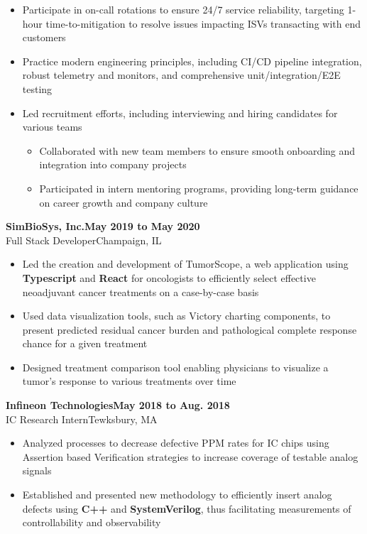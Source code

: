 \documentclass[9pt]{extarticle}
\newcommand{\experiencesubsection}[4]{
    \vspace{0.75em}\Large\textbf{#1\hfill{#4}}\\{#2}\hfill{#3}\normalsize
}
\begin{document}
\begin{minipage}[t]{.7\textwidth}
\begin{itemize}
\begin{itemize}[topsep=0pt]
            \end{itemize}
        \item Participate in on-call rotations to ensure 24/7 service reliability, targeting 1-hour time-to-mitigation to resolve issues impacting ISVs transacting with end customers
        \item Practice modern engineering principles, including CI/CD pipeline integration, robust telemetry and monitors, and comprehensive unit/integration/E2E testing 
        \item Led recruitment efforts, including interviewing and hiring candidates for various teams
            \begin{itemize}[topsep=0pt]
                \setlength\itemsep{1dd}
                \item Collaborated with new team members to ensure smooth onboarding and integration into company projects
                \item Participated in intern mentoring programs, providing long-term guidance on career growth and company culture
            \end{itemize}
    \end{itemize}

    \experiencesubsection{SimBioSys, Inc.}{Full Stack Developer}{Champaign, IL}{May 2019 to May 2020}
    \begin{itemize}
        \setlength\itemsep{1dd}
        \item Led the creation and development of TumorScope, a web application using \textbf{Typescript} and \textbf{React} for oncologists to efficiently select
            effective neoadjuvant cancer treatments on a case-by-case basis
        \item Used data visualization tools, such as Victory charting components, to present predicted residual cancer burden and pathological
            complete response chance for a given treatment
        \item Designed treatment comparison tool enabling physicians to visualize a tumor's response to various treatments over time
    \end{itemize}

    \experiencesubsection{Infineon Technologies}{IC Research Intern}{Tewksbury, MA}{May 2018 to Aug. 2018}
    \begin{itemize}
        \setlength\itemsep{1dd}
        \item Analyzed processes to decrease defective PPM rates for IC chips using Assertion based Verification strategies to increase coverage of testable analog signals
        \item Established and presented new methodology to efficiently insert analog defects using \textbf{C++} and \textbf{SystemVerilog},
            thus facilitating measurements of controllability and observability 
    \end{itemize}

\end{minipage}
\end{document}
